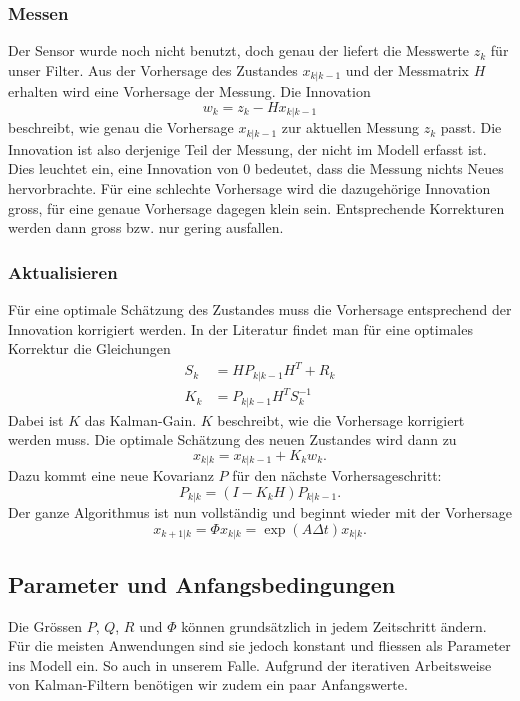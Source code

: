\subsubsection*{Messen}
Der Sensor wurde noch nicht benutzt, doch genau der liefert die Messwerte $z_k$ für unser Filter. 
Aus der Vorhersage des Zustandes $x_{k|k-1}$ und der Messmatrix $H$ erhalten wird eine Vorhersage der Messung. 
Die Innovation
\[
{w_{k}}={z_{k}}-{H}{x_{k|k-1}}
\] 
beschreibt, wie genau die Vorhersage $x_{k|k-1}$ zur aktuellen Messung $z_k$ passt. 
Die Innovation ist also derjenige Teil der Messung, der nicht im Modell erfasst ist.
Dies leuchtet ein, eine Innovation von $0$ bedeutet, dass die Messung nichts Neues hervorbrachte.
Für eine schlechte Vorhersage wird die dazugehörige Innovation gross, für eine genaue Vorhersage dagegen klein sein. 
Entsprechende Korrekturen werden dann gross bzw. nur gering ausfallen. 

\subsubsection*{Aktualisieren}

Für eine optimale Schätzung des Zustandes muss die Vorhersage entsprechend der Innovation korrigiert werden.
In der Literatur findet man für eine optimales Korrektur die Gleichungen
\begin{align*}
{S_{k}} &={H}{P_{k|k-1}}{H}^T+{R_{k}}
\\
{K_{k}} &= {P_{k|k-1}} {H^T}{S_{k}^{-1}}
\end{align*}
Dabei ist $K$ das Kalman-Gain.
$K$ beschreibt, wie die Vorhersage korrigiert werden muss.
Die optimale Schätzung des neuen Zustandes wird dann zu
\[
{x_{k|k}}={x_{k|k-1}}+{K_{k}}{w_{k}}.
\] 
Dazu kommt eine neue Kovarianz $P$ für den nächste Vorhersageschritt:
\[
{P_{k|k}}=(I-{K_{k}}{H}){P_{k|k-1}}. 
\] 
Der ganze Algorithmus ist nun vollständig und beginnt wieder mit der Vorhersage 
\[
{x_{k+1|k}}=\Phi{x_{k|k}}= \exp(A\Delta t){x_{k|k}}.
\] 


\subsection{Parameter und Anfangsbedingungen}
Die Grössen $P$, $Q$, $R$ und $\Phi$ können grundsätzlich in jedem Zeitschritt ändern.
Für die meisten Anwendungen sind sie jedoch konstant und fliessen als Parameter ins Modell ein.
So auch in unserem Falle.
Aufgrund der iterativen Arbeitsweise von Kalman-Filtern benötigen wir zudem ein paar Anfangswerte.

